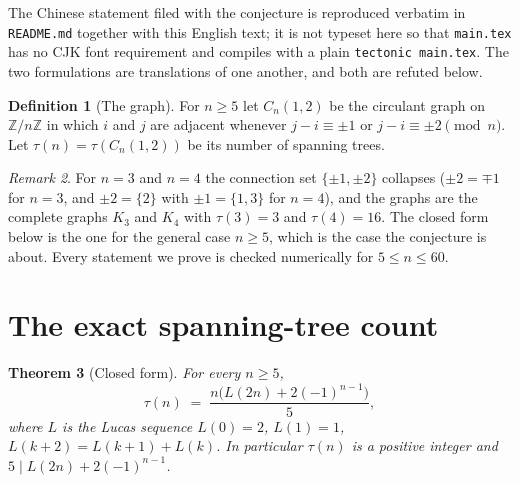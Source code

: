 \documentclass[11pt]{article}
\newtheorem{theorem}{Theorem}
\theoremstyle{definition}
\newtheorem{definition}[theorem]{Definition}
\theoremstyle{remark}
\newtheorem{remark}[theorem]{Remark}
\newcommand{\Z}{\mathbb{Z}}
\newcommand{\tauc}{\tau}
\begin{document}
\noindent The Chinese statement filed with the conjecture is reproduced verbatim
in \texttt{README.md} together with this English text; it is not typeset here so
that \texttt{main.tex} has no CJK font requirement and compiles with a plain
\texttt{tectonic main.tex}. The two formulations are translations of one
another, and both are refuted below.

\begin{definition}[The graph]
For $n \ge 5$ let $C_n(1,2)$ be the circulant graph on $\Z/n\Z$ in which $i$ and
$j$ are adjacent whenever $j-i \equiv \pm 1$ or $j-i \equiv \pm 2 \pmod n$. Let
$\tauc(n) = \tauc(C_n(1,2))$ be its number of spanning trees.
\end{definition}

\begin{remark}
For $n = 3$ and $n = 4$ the connection set $\{\pm1,\pm2\}$ collapses
($\pm2 = \mp1$ for $n=3$, and $\pm2 = \{2\}$ with $\pm1 = \{1,3\}$ for $n=4$),
and the graphs are the complete graphs $K_3$ and $K_4$ with $\tauc(3)=3$ and
$\tauc(4)=16$. The closed form below is the one for the general case $n \ge 5$,
which is the case the conjecture is about. Every statement we prove is checked
numerically for $5 \le n \le 60$.
\end{remark}

\section{The exact spanning-tree count}

\begin{theorem}[Closed form]
\label{thm:closed}
For every $n \ge 5$,
\[
\tauc(n) \;=\; \frac{n\bigl(L(2n) + 2(-1)^{n-1}\bigr)}{5},
\]
where $L$ is the Lucas sequence $L(0)=2$, $L(1)=1$,
$L(k+2)=L(k+1)+L(k)$. In particular $\tauc(n)$ is a positive integer and
$5 \mid L(2n) + 2(-1)^{n-1}$.
\end{theorem}
\end{document}
